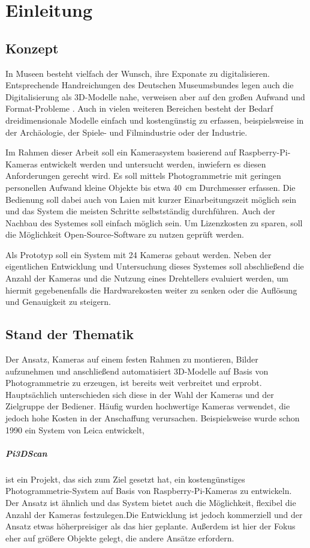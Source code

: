 \documentclass[./00PhotoBox.tex]{subfiles}
\begin{document}
\chapter{Einleitung}

\section{Konzept}

In Museen besteht vielfach der Wunsch, ihre Exponate zu digitalisieren. Entsprechende Handreichungen des Deutschen Museumsbundes legen auch die Digitalisierung als 3D-Modelle nahe, verweisen aber auf den großen Aufwand und Format-Probleme \citep[S. 43]{handreichung_digital}.
Auch in vielen weiteren Bereichen besteht der Bedarf dreidimensionale Modelle einfach und kostengünstig zu erfassen, beispielsweise in der Archäologie, der Spiele- und Filmindustrie oder der Industrie. 

Im Rahmen dieser Arbeit soll ein Kamerasystem basierend auf Raspberry-Pi-Kame\-ras entwickelt werden und untersucht werden, inwiefern es diesen Anforderungen gerecht wird. Es soll mittels Photogrammetrie mit geringen personellen Aufwand kleine Objekte bis etwa 40~cm Durchmesser erfassen. Die Bedienung soll dabei auch von Laien mit kurzer Einarbeitungszeit möglich sein und das System die meisten Schritte selbstständig durchführen. Auch der Nachbau des Systemes soll einfach möglich sein. Um Lizenzkosten zu sparen, soll die Möglichkeit Open-Source-Software zu nutzen geprüft werden.

Als Prototyp soll ein System mit 24 Kameras gebaut werden. Neben der eigentlichen Entwicklung und Untersuchung dieses Systemes soll abschließend die Anzahl der Kameras und die Nutzung eines Drehtellers evaluiert werden, um hiermit gegebenenfalls die Hardwarekosten weiter zu senken oder die Auflösung und Genauigkeit zu steigern.


\section{Stand der Thematik}
Der Ansatz, Kameras auf einem festen Rahmen zu montieren, Bilder aufzunehmen und anschließend automatisiert 3D-Modelle auf Basis von Photogrammetrie zu erzeugen, ist bereits weit verbreitet und erprobt. Hauptsächlich unterschieden sich diese in der Wahl der Kameras und der Zielgruppe der Bediener. Häufig wurden hochwertige Kameras verwendet, die jedoch hohe Kosten in der Anschaffung verursachen. Beispielsweise wurde schon 1990 ein System von Leica entwickelt,


\paragraph{Pi3DScan}
ist ein Projekt, das sich zum Ziel gesetzt hat, ein kostengünstiges Photogrammetrie-System auf Basis von Raspberry-Pi-Kameras zu entwickeln. Der Ansatz ist ähnlich und das System bietet auch die Möglichkeit, flexibel die Anzahl der Kameras festzulegen.Die Entwicklung ist jedoch kommerziell und der Ansatz etwas höherpreisiger als das hier geplante. Außerdem ist hier der Fokus eher auf größere Objekte gelegt, die andere Ansätze erfordern.
\citep{pi3dscanner}


\biblio
\end{document}
